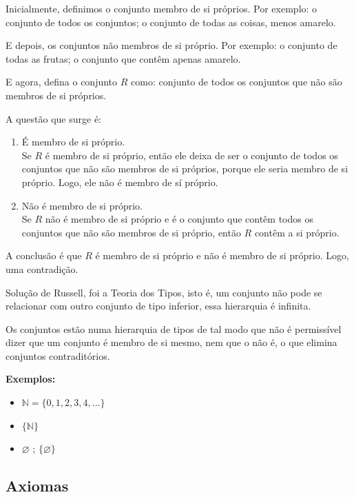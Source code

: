 \documentclass[oneside,a4paper,12pt]{article}
\begin{document}
Inicialmente, definimos o conjunto membro de si próprios. Por exemplo: o conjunto de todos os conjuntos; o conjunto de todas as coisas, menos amarelo.

E depois, os conjuntos não membros de si próprio. Por exemplo: o conjunto de todas as frutas; o conjunto que contêm apenas amarelo.

E agora, defina o conjunto $R$ como: conjunto de todos os conjuntos que não são membros de si próprios.

A questão que surge é:
\begin{enumerate}
	\item É membro de si próprio.\\ Se $R$ é membro de si próprio, então ele deixa de ser o conjunto de todos os conjuntos que não são membros de si próprios, porque ele seria membro de si próprio. Logo, ele não é membro de sí próprio.
	\item Não é membro de si próprio. \\ Se $R$ não é membro de si próprio e é o conjunto que contêm todos os conjuntos que não são membros de si próprio, então $R$ contêm a si próprio.
\end{enumerate}

A conclusão é que $R$ é membro de si próprio e não é membro de si próprio. Logo, uma contradição.

Solução de Russell, foi a Teoria dos Tipos, isto é, um conjunto não pode se relacionar com outro conjunto de tipo inferior, essa hierarquia é infinita. 

Os conjuntos estão numa hierarquia de tipos de tal modo que não é permissível dizer que um conjunto é membro de si mesmo, nem que o não é, o que elimina conjuntos contraditórios.

\textbf{Exemplos: }
\begin{itemize}
	\item $\mathbb{N} = \{0,1,2,3,4, \dots\}$
	\item $\{\mathbb{N}\}$
	\item $\varnothing$ ; $\{\varnothing\}$
\end{itemize}

\subsection{Axiomas} 
\end{document}
